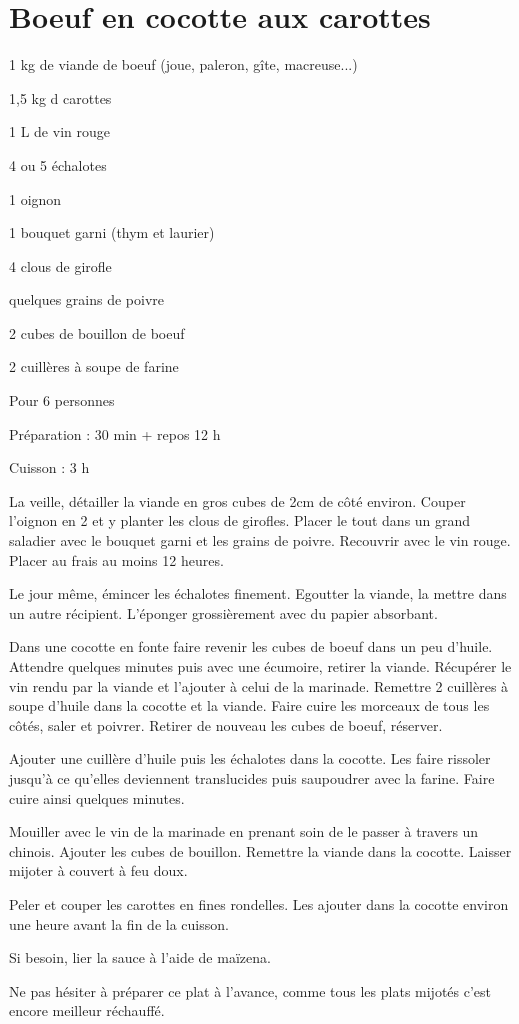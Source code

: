 \section{Boeuf en cocotte aux carottes}

\begin{ingredients}
\item 1 kg de viande de boeuf (joue, paleron, gîte, macreuse...)
\item 1,5 kg d carottes
\item 1 L de vin rouge
\item 4 ou 5 échalotes
\item 1 oignon
\item 1 bouquet garni (thym et laurier)
\item 4 clous de girofle
\item quelques grains de poivre
\item 2 cubes de bouillon de boeuf
\item 2 cuillères à soupe de farine
\end{ingredients}
\begin{infos}
\item Pour 6 personnes		%
\item Préparation : 30 min + repos 12 h		%
\item Cuisson : 3 h			%
\end{infos}
\begin{etapes}
\item La veille, détailler la viande en gros cubes de 2cm de côté environ. Couper l'oignon en 2 et y planter les clous de girofles. Placer le tout dans un grand saladier avec le bouquet garni et les grains de poivre. Recouvrir avec le vin rouge. Placer au frais au moins 12 heures.
\item Le jour même, émincer les échalotes finement. Egoutter la viande, la mettre dans un autre récipient. L'éponger grossièrement avec du papier absorbant. 
\item Dans une cocotte en fonte faire revenir les cubes de boeuf dans un peu d'huile. Attendre quelques minutes puis avec une écumoire, retirer la viande. Récupérer le vin rendu par la viande et l'ajouter à celui de la marinade. Remettre 2 cuillères à soupe d'huile dans la cocotte et la viande. Faire cuire les morceaux de tous les côtés, saler et poivrer. Retirer de nouveau les cubes de boeuf, réserver. 
\item Ajouter une cuillère d'huile puis les échalotes dans la cocotte. Les faire rissoler jusqu'à ce qu'elles deviennent translucides puis saupoudrer avec la farine. Faire cuire ainsi quelques minutes. 
\item Mouiller avec le vin de la marinade en prenant soin de le passer à travers un chinois. Ajouter les cubes de bouillon. Remettre la viande dans la cocotte. Laisser mijoter à couvert à feu doux.
\item Peler et couper les carottes en fines rondelles. Les ajouter dans la cocotte environ une heure avant la fin de la cuisson.
\item Si besoin, lier la sauce à l'aide de maïzena.
\end{etapes}
\begin{conseils}
Ne pas hésiter à préparer ce plat à l'avance, comme tous les plats mijotés c'est encore meilleur réchauffé.
\end{conseils}
